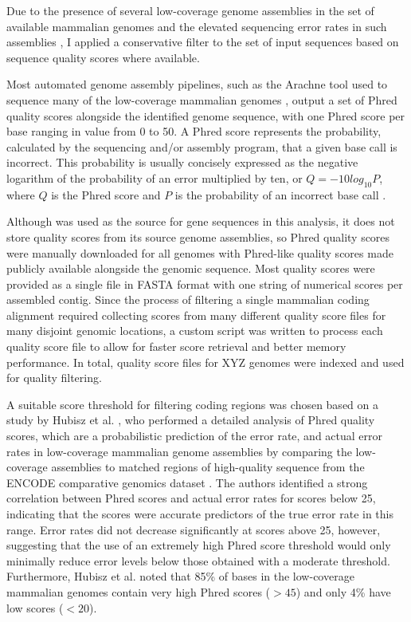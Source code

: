 Due to the presence of several low-coverage genome assemblies in the
set of available mammalian genomes and the elevated sequencing error
rates in such assemblies \citep{Hubbard2007}, I applied a conservative
filter to the set of input sequences based on sequence quality scores
where available.

Most automated genome assembly pipelines, such as the Arachne tool
used to sequence many of the low-coverage mammalian genomes
\citep{Jaffe2003}, output a set of Phred quality scores alongside the
identified genome sequence, with one Phred score per base ranging in
value from 0 to 50. A Phred score represents the probability,
calculated by the sequencing and/or assembly program, that a given
base call is incorrect. This probability is usually concisely
expressed as the negative logarithm of the probability of an error
multiplied by ten, or $Q=-10log_{10}P$, where $Q$ is the Phred score
and $P$ is the probability of an incorrect base call \citep{Cock2010}.

Although \ens was used as the source for gene sequences in this
analysis, it does not store quality scores from its source genome
assemblies, so Phred quality scores were manually downloaded for all
genomes with Phred-like quality scores made publicly available
alongside the genomic sequence. Most quality scores were provided as a
single file in FASTA format with one string of numerical scores per
assembled contig. Since the process of filtering a single mammalian
coding alignment required collecting scores from many different
quality score files for many disjoint genomic locations, a custom
script was written to process each quality score file to allow for
faster score retrieval and better memory performance. In total,
quality score files for XYZ genomes were indexed and used for quality
filtering.

A suitable score threshold for filtering coding regions was chosen
based on a study by Hubisz et al. \citeyearpar{Hubisz2011}, who
performed a detailed analysis of Phred quality scores, which are a
probabilistic prediction of the error rate, and actual error rates in
low-coverage mammalian genome assemblies by comparing the low-coverage
assemblies to matched regions of high-quality sequence from the ENCODE
comparative genomics dataset
\citep{ENCODE_Project_Consortium2007a}. The authors identified a
strong correlation between Phred scores and actual error rates for
scores below 25, indicating that the scores were accurate predictors
of the true error rate in this range. Error rates did not decrease
significantly at scores above 25, however, suggesting that the use of
an extremely high Phred score threshold would only minimally reduce
error levels below those obtained with a moderate
threshold. Furthermore, Hubisz et al. noted that 85\% of bases in the
low-coverage mammalian genomes contain very high Phred scores ($>45$)
and only 4\% have low scores ($<20$).

